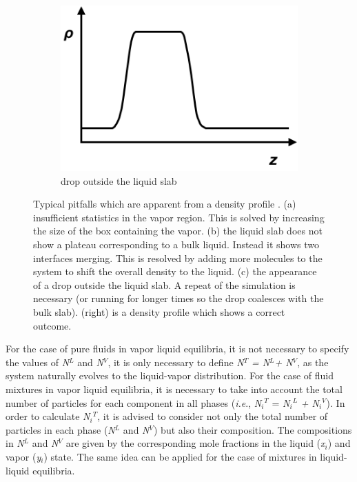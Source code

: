 \documentclass{scrbook}
\begin{document}
\begin{figure}
	\begin{subfigure}{0.4\textwidth} %
    \includegraphics[width=1\textwidth]{gfx/image21.png}
		\caption{drop outside the liquid slab} %
	\end{subfigure}
  \caption{Typical pitfalls which are apparent from a density profile
. (a) insufficient statistics in the vapor region. This is solved by increasing
the size of the box containing the vapor. (b) the liquid slab does not show
a plateau corresponding to a bulk liquid. Instead it shows two interfaces
merging. This is resolved by adding more molecules to the system to shift the
overall density to the liquid. (c) the appearance of a drop outside the liquid
slab. A repeat of the simulation is necessary (or running for longer times so
the drop coalesces with the bulk slab). (right) is a density profile which
shows a correct outcome.
}
\label{fig:7}
\end{figure}

For the case of pure fluids in vapor \textendash{} liquid equilibria, it is not
necessary to specify the values of \textit{N}$^{L}$ and \textit{N}$^{V}$, it is
only necessary to define \textit{N}$^{T}$ \textit{= N}$^{L}$\textit{+ N}$^{V}$,
as the system naturally evolves to the liquid-vapor distribution. For the case
of fluid mixtures in vapor \textendash{} liquid equilibria, it is necessary to
take into account the total number of particles for each component in all
phases (\textit{i.e}., \textit{N}$_{i}$$^{T}$ = \textit{N}$_{i}$$^{L}$
\textit{+ N}$_{i}$$^{V}$). In order to calculate \textit{N}$_{i}$$^{T}$, it is
advised to consider not only the total number of particles in each phase
(\textit{N}$^{L}$ and \textit{N}$^{V}$) but also their composition. The
compositions in \textit{N}$^{L}$ and \textit{N}$^{V}$ are given by the
corresponding mole fractions in the liquid (\textit{x}$_{i}$) and vapor
(\textit{y}$_{i}$) state. The same idea can be applied for the case of mixtures
in liquid-liquid equilibria.
\end{document}
